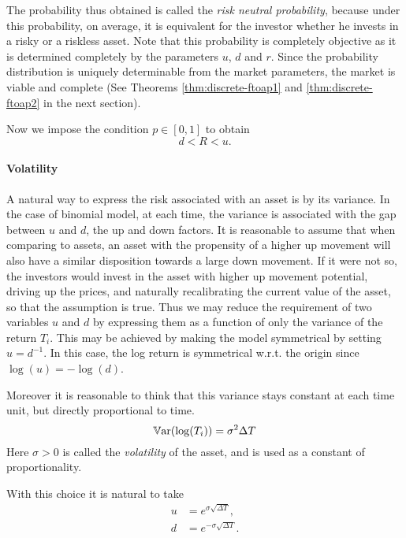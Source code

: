 The probability thus obtained is called the \emph{risk neutral probability}, because under this probability, on average, it is equivalent for the investor whether he invests in a risky or a riskless asset. Note that this probability is completely objective as it is determined completely by the parameters $ u $, $ d $ and $ r $. Since the probability distribution is uniquely determinable from the market parameters, the market is viable and complete (See Theorems \ref{thm:discrete-ftoap1} and \ref{thm:discrete-ftoap2} in the next section).

Now we impose the condition $ p \in [0,1] $ to obtain
\begin{equation}
	\label{eq:discrete-feasibility-condition}
	d < R < u .
\end{equation}


\paragraph{Volatility}
A natural way to express the risk associated with an asset is by its variance. In the case of binomial model, at each time, the variance is associated with the gap between $ u $ and $ d $, the up and down factors. It is reasonable to assume that when comparing to assets, an asset with the propensity of a higher up movement will also have a similar disposition towards a large down movement. If it were not so, the investors would invest in the asset with higher up movement potential, driving up the prices, and naturally recalibrating the current value of the asset, so that the assumption is true. Thus we may reduce the requirement of two variables $ u $ and $ d $ by expressing them as a function of only the variance of the return $ T_i $. This may be achieved by making the model symmetrical by setting $ u = d^{-1} $. In this case, the log return is symmetrical w.r.t. the origin since $ \log (u) = - \log (d) $.

Moreover it is reasonable to think that this variance stays constant at each time unit, but directly proportional to time.
\begin{equation*}
	\operatorname{\mathbb{V}\mathrm{ar}}(\log(T_i)) = \sigma^2 \Delta T
\end{equation*}
Here $ \sigma > 0 $ is called the \emph{volatility} of the asset, and is used as a constant of proportionality.

With this choice it is natural to take
\begin{subequations}
	\label{eq:discrete-ud}
	\begin{align}
		u &= e^{\sigma \sqrt{\Delta T}} , \\
		d &= e^{- \sigma \sqrt{\Delta T}} .
	\end{align}
\end{subequations}

